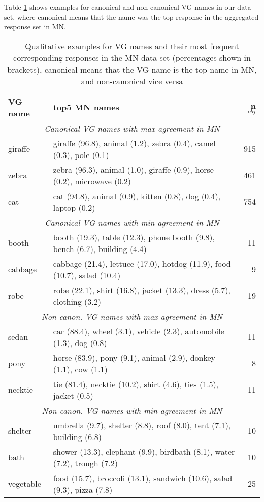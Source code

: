  Table \ref{tab:qual} shows examples for canonical and non-canonical VG names in our data set, where canonical means that the name was the top response in the aggregated response set in MN.

\begin{table}
\small
\begin{tabular}{lp{4.8cm}r}
\toprule
VG name &  top5 MN names &  n$_{obj}$  \\
\midrule
\multicolumn{3}{c}{\it Canonical VG names with max agreement in MN}\\
 giraffe &  giraffe (96.8), animal (1.2), zebra (0.4), camel (0.3), pole (0.1) &  915 \\
 zebra &  zebra (96.3), animal (1.0), giraffe (0.9), horse (0.2), microwave (0.2) &  461  \\
 cat &  cat (94.8), animal (0.9), kitten (0.8), dog (0.4), laptop (0.2) &  754\\
\midrule
\multicolumn{3}{c}{\it Canonical VG names with min agreement in MN}\\
 booth &  booth (19.3), table (12.3), phone booth (9.8), bench (6.7), building (4.4) &  11 \\
 cabbage &  cabbage (21.4), lettuce (17.0), hotdog (11.9), food (10.7), salad (10.4) &  9 \\
 robe &  robe (22.1), shirt (16.8), jacket (13.3), dress (5.7), clothing (3.2) &  19 \\
  \midrule
  \multicolumn{3}{c}{\it Non-canon. VG names with max agreement in MN}\\
 sedan &  car (88.4), wheel (3.1), vehicle (2.3), automobile (1.3), dog (0.8) &  11 \\
 pony &  horse (83.9), pony (9.1), animal (2.9), donkey (1.1), cow (1.1) &  8 \\
 necktie &  tie (81.4), necktie (10.2), shirt (4.6), ties (1.5), jacket (0.5) &  11 \\
 \midrule
   \multicolumn{3}{c}{\it Non-canon. VG names with min agreement in MN}\\
 shelter &  umbrella (9.7), shelter (8.8), roof (8.0), tent (7.1), building (6.8) &  10 \\
 bath &  shower (13.3), elephant (9.9), birdbath (8.1), water (7.2), trough (7.2) &  10 \\
 vegetable &  food (15.7), broccoli (13.1), sandwich (10.6), salad (9.3), pizza (7.8) &  25 \\
\bottomrule
\end{tabular}
\caption{Qualitative examples for VG names and their most frequent corresponding responses in the MN data set (percentages shown in brackets), canonical means that the VG name is the top name in MN, and non-canonical vice versa}
\label{tab:qual}
\end{table}



